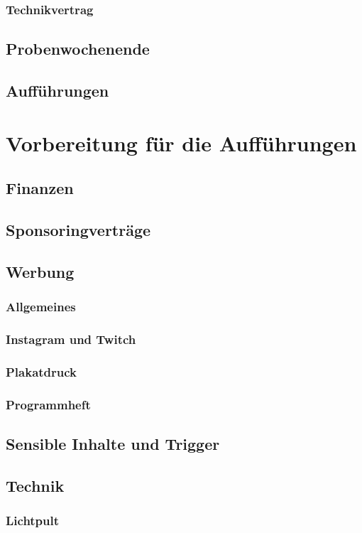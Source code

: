 \documentclass[a4paper]{article}
\begin{document}
\subsubsection{Technikvertrag}
\subsection{Probenwochenende}
\subsection{Aufführungen}

\newpage

\section{Vorbereitung für die Aufführungen}
\subsection{Finanzen}
\subsection{Sponsoringverträge}
\subsection{Werbung}
\subsubsection{Allgemeines}
\subsubsection{Instagram und Twitch}
\subsubsection{Plakatdruck}
\subsubsection{Programmheft}
\subsection{Sensible Inhalte und Trigger}
\subsection{Technik}
\subsubsection{Lichtpult}
\end{document}
